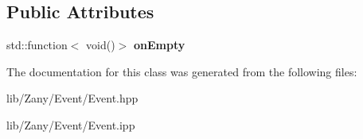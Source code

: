 \subsection*{Public Attributes}
\begin{DoxyCompactItemize}
\item 
\mbox{\label{classzany_1_1evt_1_1_event_ae21179a719cd7f3bad94fe775774a9ba}} 
std\+::function$<$ void()$>$ {\bfseries on\+Empty}
\end{DoxyCompactItemize}


The documentation for this class was generated from the following files\+:\begin{DoxyCompactItemize}
\item 
lib/\+Zany/\+Event/Event.\+hpp\item 
lib/\+Zany/\+Event/Event.\+ipp\end{DoxyCompactItemize}
